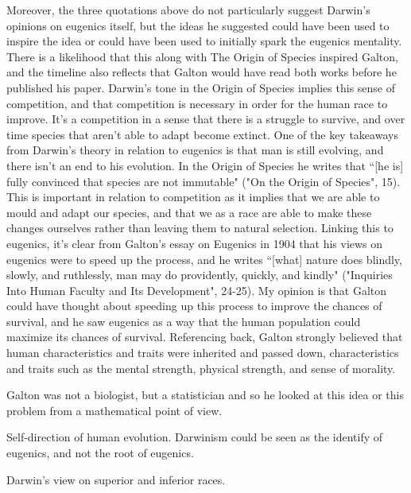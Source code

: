 \documentclass[11pt, oneside]{article}
\begin{document}
\par Moreover, the three quotations above do not particularly suggest Darwin's opinions on eugenics itself, but the ideas he suggested could have been used to inspire the idea or could have been used to initially spark the eugenics mentality. There is a likelihood that this along with The Origin of Species inspired Galton, and the timeline also reflects that Galton would have read both works before he published his paper. Darwin's tone in the Origin of Species implies this sense of competition, and that competition is necessary in order for the human race to improve. It's a competition in a sense that there is a struggle to survive, and over time species that aren't able to adapt become extinct. One of the key takeaways from Darwin's theory in relation to eugenics is that man is still evolving, and there isn't an end to his evolution. In the Origin of Species he writes that ``[he is] fully convinced that species are not immutable" ("On the Origin of Species", 15). This is important in relation to competition as it implies that we are able to mould and adapt our species, and that we as a race are able to make these changes ourselves rather than leaving them to natural selection. Linking this to eugenics, it's clear from Galton's essay on Eugenics in 1904 that his views on eugenics were to speed up the process, and he writes ``[what] nature does blindly, slowly, and ruthlessly, man may do providently, quickly, and kindly" ("Inquiries Into Human Faculty and Its Development", 24-25). My opinion is that Galton could have thought about speeding up this process to improve the chances of survival, and he saw eugenics as a way that the human population could maximize its chances of survival. Referencing back, Galton strongly believed that human characteristics and traits were inherited and passed down, characteristics and traits such as the mental strength, physical strength, and sense of morality. 


\par Galton was not a biologist, but a statistician and so he looked at this idea or this problem from a mathematical point of view. 

\par Self-direction of human evolution. Darwinism could be seen as the identify of eugenics, and not the root of eugenics.
\par Darwin's view on superior and inferior races. 
\end{document}
